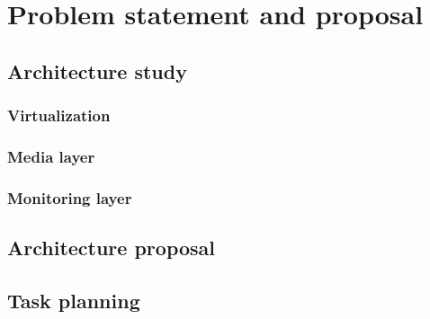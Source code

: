 \chapter{Problem statement and proposal}\label{B:problemStatementAndProposal}

\section{Architecture study}
\subsection{Virtualization}
\subsection{Media layer}
\subsection{Monitoring layer}
\section{Architecture proposal}
\section{Task planning}



